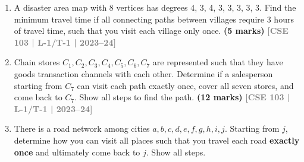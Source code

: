 \documentclass[12pt,a3paper]{article}
\newcommand{\yr}[1]{\hfill\textcolor{gray}{\small\textbf{[#1]}}}
\newcommand{\mk}[1]{\textcolor{orange!70!black}{\small\textbf{(#1 marks)}}}
\begin{document}
\begin{enumerate}

\item A disaster area map with 8 vertices has degrees 4, 3, 4, 3, 3, 3, 3, 3. Find the minimum travel time if all connecting paths between villages require 3 hours of travel time, such that you visit each village only once.
\mk{5} \yr{CSE 103 | L-1/T-1 | 2023--24}

\item Chain stores $C_1, C_2, C_3, C_4, C_5, C_6, C_7$ are represented such that they have goods transaction channels with each other. Determine if a salesperson starting from $C_7$ can visit each path exactly once, cover all seven stores, and come back to $C_7$. Show all steps to find the path.
\mk{12} \yr{CSE 103 | L-1/T-1 | 2023--24}

\item There is a road network among cities $a, b, c, d, e, f, g, h, i, j$. Starting from $j$, determine how you can visit all places such that you travel each road \textbf{exactly once} and ultimately come back to $j$. Show all steps.
\begin{center}
\end{center}
\end{enumerate}
\end{document}
